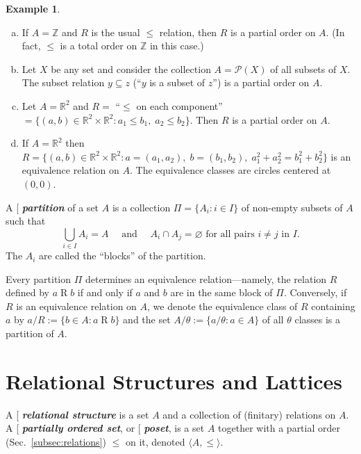 \documentclass[12pt]{article}
\theoremstyle{plain}
\theoremstyle{definition}
\newtheorem{examples}[theorem]{Example}
\theoremstyle{remark}
\theoremstyle{remark}
\numberwithin{theorem}{section}
\numberwithin{equation}{section}
\newcommand{\<}{\ensuremath{\langle}}
\renewcommand{\>}{\ensuremath{\rangle}}
\newcommand{\rel}[1]{\ensuremath{\mathbin{#1}}}
\renewcommand{\emptyset}{\ensuremath{\varnothing}}
\renewcommand{\leq}{\ensuremath{\leqslant}}
\newcommand{\Eq}{\ensuremath{\operatorname{Eq}}}
\newcommand{\Z}{\ensuremath{\mathbb{Z}}}   %
\newcommand{\R}{\ensuremath{\mathbb{R}}}   %
\newcommand{\indexit}[1]{\index{#1|textit}}
\def\defn#1{\gdef\defnstring{#1}%
  \xdef\dodefnii{{\noexpand\bfseries\noexpand\em
       \defnstring}\noexpand\indexit{\defnstring}\noexpand\makeatother}%
  \futurelet\nextthing\dodefn}
\def\dodefn{%
  \ifx\nextthing[\let\next=\dodefni
    \else\let\next=\dodefnii\fi
  \makeatletter
  \next}
\def\dodefni[#1]{%
  {\bfseries\em\defnstring}%
  \indexit{#1}%
  \makeatother}
\begin{document}
\begin{examples}~
  \begin{enumerate}[(a)]
\item If $A = \Z$ and $R$ is the usual $\leq$ relation, then $R$ is a partial
  order on $A$.  (In fact, $\leq$ is a total order on $\Z$ in this case.)
\item Let $X$ be any set and consider the collection $A = \mathcal{P}(X)$ of all
  subsets of $X$.  The subset relation $y \subseteq z$ 
  (``$y$ is a subset of $z$'') is a partial order on $A$.
\item Let $A = \R^2$ and $R =$ ``$\leq$ on each component''
  $= \{(a, b) \in \R^2\times \R^2 : a_1 \leq b_1, \; a_2\leq b_2 \}$.
    Then $R$ is a partial order on $A$.
\item If $A = \R^2$ then 
    $R = \{(a, b) \in \R^2\times \R^2 : a = (a_1, a_2), \; b = (b_1, b_2), \; a_1^2+ a_2^2 = b_1^2+ b_2^2 \}$
    is an equivalence relation on $A$.  
    The equivalence classes are circles centered at $(0,0)$.
  \end{enumerate}
\end{examples}


A \defn{partition} of a set $A$ is a collection $\Pi = \{A_i : i\in I\}$
of non-empty subsets of $A$ such that
\[
\bigcup_{i\in I} A_i = A \quad \text{ and } \quad  A_i \cap A_j = 
\emptyset \text{ for all pairs $i\neq j$ in $I$.}
\]
The $A_i$ are called the ``blocks'' of the partition.

Every partition $\Pi$ determines an equivalence relation---namely, the relation $R$
defined by $a\rel{R} b$ if and only if $a$ and $b$ are in the same block of $\Pi$. 
Conversely, if $R$ is an equivalence relation on 
$A$, %
we denote the equivalence class of $R$ containing
$a$ by $a/R := \{b\in A : a \rel{R} b\}$
and the set $A/\theta := \{a/\theta : a\in A\}$ of all $\theta$ classes is a
partition of $A$.





\section{Relational Structures and Lattices}
A \defn{relational structure} is a set $A$ and a collection of (finitary)
relations on $A$.  
  
A \defn{partially ordered set}, or \defn{poset}, is a set $A$ together
with a partial order (Sec.~\ref{subsec:relations}) $\leq$ on it, denoted $\<A, \leq\>$.  
\end{document}
